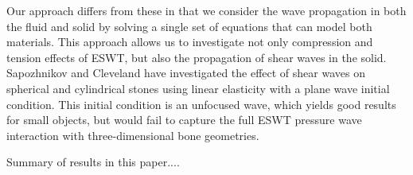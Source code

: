 Our approach differs from these in that we consider the wave
propagation in both the fluid and solid by solving a single set of
equations that can model both materials.  This approach allows us
to investigate not only compression and tension effects of ESWT,
but also the propagation of shear waves in the solid.  Sapozhnikov
and Cleveland \cite{oleg_cleveland} have investigated the effect
of shear waves on spherical and cylindrical stones using linear
elasticity with a plane wave initial condition.  This initial
condition is an unfocused wave, which yields good results for small
objects, but would fail to capture the full ESWT pressure wave
interaction with three-dimensional bone geometries.

Summary of results in this paper....


